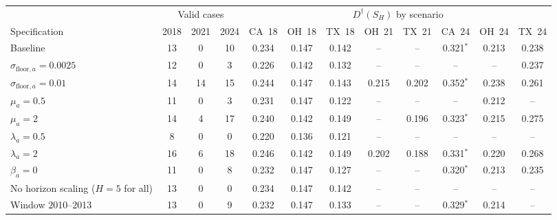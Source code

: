 \begin{tabular}{@{}lccccccccccc@{}}
\toprule
 & \multicolumn{3}{c}{Valid cases} & \multicolumn{8}{c}{\(D^\dagger(S_H)\) by scenario} \\
\cmidrule(lr){2-4}\cmidrule(l){5-12}
Specification & 2018 & 2021 & 2024 & CA~18 & OH~18 & TX~18 & OH~21 & TX~21 & CA~24 & OH~24 & TX~24 \\
\midrule
Baseline & 13 & 0 & 10 & 0.234 & 0.147 & 0.142 & -- & -- & 0.321\(^{\ast}\) & 0.213 & 0.238 \\
\midrule
\(\sigma_{\mathrm{floor},a}=0.0025\) & 12 & 0 & 3 & 0.226 & 0.142 & 0.132 & -- & -- & -- & -- & 0.237 \\
\(\sigma_{\mathrm{floor},a}=0.01\) & 14 & 14 & 15 & 0.244 & 0.147 & 0.143 & 0.215 & 0.202 & 0.352\(^{\ast}\) & 0.238 & 0.261 \\
\(\mu_a=0.5\) & 11 & 0 & 3 & 0.231 & 0.147 & 0.122 & -- & -- & -- & 0.212 & -- \\
\(\mu_a=2\) & 14 & 4 & 17 & 0.240 & 0.142 & 0.149 & -- & 0.196 & 0.323\(^{\ast}\) & 0.215 & 0.275 \\
\(\lambda_a=0.5\) & 8 & 0 & 0 & 0.220 & 0.136 & 0.121 & -- & -- & -- & -- & -- \\
\(\lambda_a=2\) & 16 & 6 & 18 & 0.246 & 0.142 & 0.149 & 0.202 & 0.188 & 0.331\(^{\ast}\) & 0.220 & 0.268 \\
\(\beta_a=0\) & 11 & 0 & 8 & 0.232 & 0.147 & 0.127 & -- & -- & 0.320\(^{\ast}\) & 0.213 & 0.235 \\
No horizon scaling (\(H=5\) for all) & 13 & 0 & 0 & 0.234 & 0.147 & 0.142 & -- & -- & -- & -- & -- \\
Window 2010--2013 & 13 & 0 & 9 & 0.232 & 0.147 & 0.133 & -- & -- & 0.329\(^{\ast}\) & 0.214 & -- \\
\bottomrule
\end{tabular}
